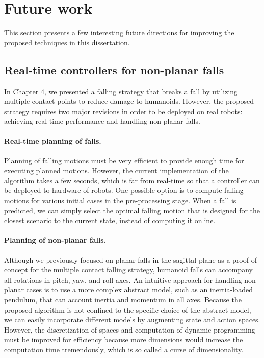 \section{Future work}
This section presents a few interesting future directions for improving the
proposed techniques in this dissertation.

\subsection{Real-time controllers for non-planar falls}
In Chapter 4, we presented a falling strategy that breaks a fall by
utilizing multiple contact points to reduce damage to humanoids.
However, the proposed strategy requires two major revisions in order to be
deployed on real robots: achieving real-time performance and handling
non-planar falls. 

\paragraph{Real-time planning of falls.}
Planning of falling motions must be very efficient to provide enough time for
executing planned motions. 
However, the current implementation of the algorithm takes a few seconds, which
is far from real-time so that a controller can be deployed to hardware of robots.
One possible option is to compute falling motions for
various initial cases in the pre-processing stage.
When a fall is predicted, we can simply select the optimal falling motion
that is designed for the closest scenario to the current state,
instead of computing it online.

\paragraph{Planning of non-planar falls.}
Although we previously focused on planar falls in the sagittal plane as a proof
of concept for the multiple contact falling strategy, humanoid falls
can accompany all rotations in pitch, yaw, and roll axes.
An intuitive approach for handling non-planar cases is to use a more complex
abstract model, such as an inertia-loaded pendulum, that can account inertia
and momentum in all axes.
Because the proposed algorithm is not confined to the specific choice of the
abstract model, we can easily incorporate different models by
augmenting state and action spaces. 
However, the discretization of spaces and computation of dynamic programming
must be improved for efficiency because more dimensions would increase the
computation time tremendously, which is so called a curse of dimensionality. 

